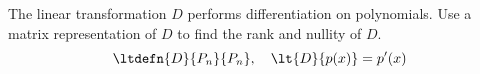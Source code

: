 The linear transformation $D$ performs differentiation on polynomials.  Use a matrix representation of $D$ to find the rank and nullity of $D$.
%
\begin{equation*}
\ltdefn{D}{P_n}{P_n},\quad \lt{D}{p(x)}=p^\prime(x)
\end{equation*}